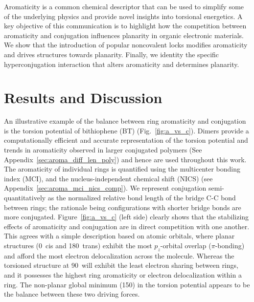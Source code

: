 Aromaticity is a common chemical descriptor that can be used to simplify some of the underlying physics and provide novel insights into torsional energetics. A key objective of this communication is to highlight how the competition between aromaticity and conjugation\cite{Hernandez1994, Kertesz2005, Huang2017} influences planarity in organic electronic materials. We show that the introduction of popular noncovalent locks modifies aromaticity and drives structures towards planarity. Finally, we identity the specific hyperconjugation interaction that alters aromaticity and determines planarity.

\section{Results and Discussion}

An illustrative example of the balance between ring aromaticity and conjugation is the torsion potential of bithiophene (BT) (Fig.~\ref{fig:a_vs_c}). Dimers provide a computationally efficient and accurate representation of the torsion potential and trends in aromaticity observed in larger conjugated polymers (See Appendix~\ref{sec:aroma_diff_len_poly})\cite{Dubay2012} and hence are used throughout this work. The aromaticity of individual rings is quantified using the multicenter bonding index (MCI),\cite{Giambiagi1990, Giambiagi2000} and the nucleus-independent chemical shift (NICS)\cite{Fallah-Bagher-Shaidaei2006, Chen2005} (see Appendix~\ref{sec:aroma_mci_nics_comp}). We represent conjugation semi-quantitatively as the normalized relative bond length of the bridge C-C bond between rings; the rationale being configurations with shorter bridge bonds are more conjugated.\cite{Daudey1980, Fernandez2006} Figure~\ref{fig:a_vs_c} (left side) clearly shows that the stabilizing effects of aromaticity and conjugation are in direct competition with one another. This agrees with a simple description based on atomic orbitals, where planar structures (0\textdegree \ cis and 180\textdegree \ trans) exhibit the most $p_z$-orbital overlap ($\pi$-bonding) and afford the most electron delocalization across the molecule. Whereas the torsioned structure at 90\textdegree \ will exhibit the least electron sharing between rings, and it possesses the highest ring aromaticity or electron delocalization within a ring. The non-planar global minimum (150\textdegree) in the torsion potential appears to be the balance between these two driving forces.

